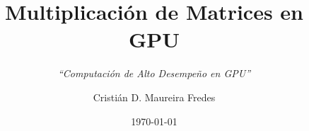 \documentclass{beamer}
\author[Cristián D. Maureira Fredes]{\large Cristián D. Maureira Fredes}
\title[Multiplicación de Matrices en GPU]{\huge Multiplicación de Matrices en GPU}
\subtitle{\large \textit{``Computación de Alto Desempeño en GPU''}}
\institute{\textbf{Departamento de Informática\\ (UTFSM)}}
\date{\today}
\begin{document}
\begin{frame}[t,plain]
\titlepage
\end{frame}






\end{document}

